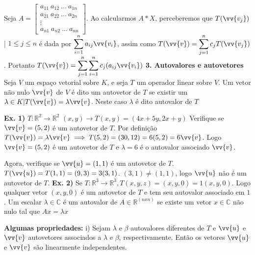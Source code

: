 \documentclass[11pt,a4paper]{article}
\newcommand\tab[1][1.835cm]{\hspace*{#1}}
\begin{document}
\begin{flushleft}
\tab Seja $A = \begin{bmatrix} a_{11} \ a_{12} \ ... \ a_{1n} \\ a_{21} \ a_{22} \ ... \ a_{2n} \\ \vdots \\ a_{n1} \ a_{n2} \ ... \ a_{nn} \end{bmatrix}$. Ao calcularmos $A*X$, perceberemos que $ T(\vv{v_j})$ | $ 1 \leq j \leq n  $ é dada por $ \displaystyle\sum_{i=1}^n a_{ij}\vv{v_i} $, assim como $T(\vv{v}) = \displaystyle\sum_{j=1}^n c_jT(\vv{v_j}) $. Portanto $T(\vv{v}) = \displaystyle\sum_{j=1}^n \displaystyle\sum_{i=1}^n c_j(a_{ij}\vv{v_i})$ \linebreak 
\newline \newline \textbf{3. Autovalores e autovetores}\linebreak
\tab Seja $V$ um espaço vetorial sobre $K$, e seja $T$ um operador linear sobre $V$. Um vetor não nulo $\vv{v}$ de $V$ é dito um autovetor de $T $ se existir um $\lambda \in K | T(\vv{v}) = \lambda\vv{v}$. Neste caso $\lambda$ é dito autovalor de $T$ \linebreak

\tab \textbf{Ex. 1)} $T: \mathbb{R}^2 \rightarrow \mathbb{R}^2$  
$(x,y) \rightarrow T(x,y) = (4x+5y,2x+y)$ Verifique se $\vv{v} = (5,2)$ é um autovetor de $T $. Por definição $ T( \vv{v} ) = \lambda\vv{v} \implies T(5,2) = (30,12) =6(5,2) = 6\vv{v}$. Logo $\vv{v} = (5,2)$ é um autovetor de $T$ e $\lambda = 6$ é o autovalor associado $\vv{v}$. \linebreak

\tab Agora, verifique se $\vv{u} = (1,1)$ é um autovetor de $T$. 
\newline \tab $T(\vv{u}) = T(1,1) = (9,3) = 3(3,1)$. $(3,1) \neq (1,1)$, logo $\vv{u}$ não é um autovetor de $T$. 
\newline \newline \tab \textbf{Ex. 2)} Se $T: \mathbb{R}^3 \rightarrow \mathbb{R}^3, T(x,y,z) = (x,y,0) = 1 (x,y,0)$. Logo qualquer vetor $(x,y,0)$ é um autovetor de $T$ e tem seu autovalor associado em $1$.
\newline \tab Um escalar $\lambda \in \mathbb{C}$ é um autovalor de $A \in \mathbb{R}^(nxn)$ se existe um vetor $x \in \mathbb{C}$ não nulo tal que $Ax = \lambda x$ \linebreak

\tab \textbf{Algumas propriedades: }
\newline \tab i) Sejam $\lambda$ e $\beta$ autovalores diferentes de $T$ e $\vv{u}$ e $\vv{v}$ autovetores associados a $\lambda$ e $\beta$, respectivamente. Então os vetores $\vv{u}$ e $\vv{v}$ são linearmente independentes. \linebreak


\end{flushleft}
\end{document}

